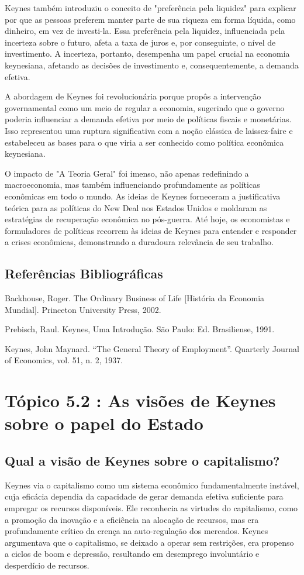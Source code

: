 \documentclass[a4paper,12pt]{article}[abntex2]
\begin{document}
Keynes também introduziu o conceito de "preferência pela liquidez" para explicar por que as pessoas preferem manter parte de sua riqueza em forma líquida, como dinheiro, em vez de investi-la. Essa preferência pela liquidez, influenciada pela incerteza sobre o futuro, afeta a taxa de juros e, por conseguinte, o nível de investimento. A incerteza, portanto, desempenha um papel crucial na economia keynesiana, afetando as decisões de investimento e, consequentemente, a demanda efetiva.

A abordagem de Keynes foi revolucionária porque propôs a intervenção governamental como um meio de regular a economia, sugerindo que o governo poderia influenciar a demanda efetiva por meio de políticas fiscais e monetárias. Isso representou uma ruptura significativa com a noção clássica de laissez-faire e estabeleceu as bases para o que viria a ser conhecido como política econômica keynesiana.

O impacto de "A Teoria Geral" foi imenso, não apenas redefinindo a macroeconomia, mas também influenciando profundamente as políticas econômicas em todo o mundo. As ideias de Keynes forneceram a justificativa teórica para as políticas do New Deal nos Estados Unidos e moldaram as estratégias de recuperação econômica no pós-guerra. Até hoje, os economistas e formuladores de políticas recorrem às ideias de Keynes para entender e responder a crises econômicas, demonstrando a duradoura relevância de seu trabalho.

\subsection{\textbf{Referências Bibliográficas}}
Backhouse, Roger. The Ordinary Business of Life [História da Economia Mundial]. Princeton
University Press, 2002.

Prebisch, Raul. Keynes, Uma Introdução. São Paulo: Ed. Brasiliense, 1991.

Keynes, John Maynard. “The General Theory of Employment”. Quarterly Journal of Economics,
vol. 51, n. 2, 1937.

\section{\textbf{Tópico 5.2 : As visões de Keynes sobre o papel do Estado}}
\subsection{\textbf{Qual a visão de Keynes sobre o capitalismo?}}
Keynes via o capitalismo como um sistema econômico fundamentalmente instável, cuja eficácia dependia da capacidade de gerar demanda efetiva suficiente para empregar os recursos disponíveis. Ele reconhecia as virtudes do capitalismo, como a promoção da inovação e a eficiência na alocação de recursos, mas era profundamente crítico da crença na auto-regulação dos mercados. Keynes argumentava que o capitalismo, se deixado a operar sem restrições, era propenso a ciclos de boom e depressão, resultando em desemprego involuntário e desperdício de recursos.
\end{document}

